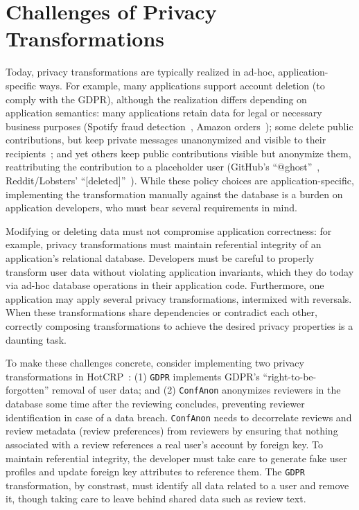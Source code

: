 \section{Challenges of Privacy Transformations}
\label{sec:survey}
%

%
Today, privacy transformations are typically realized in ad-hoc, application-specific ways.
%
For example, many applications support account deletion (\eg to comply with the GDPR),
although the realization differs depending on application semantics: many applications retain
data for legal or necessary business purposes (\eg Spotify fraud detection~\cite{spotify:privacy},
Amazon orders~\cite{amazon:privacy}); some delete public contributions, but keep private
messages unanonymized and visible to their recipients~\cite{facebook:privacy, twitter:privacy};
and yet others keep public contributions visible but anonymize them, reattributing the contribution
to a placeholder user (\eg GitHub's ``@ghost''~\cite{github:privacy}, Reddit/Lobsters'
``[deleted]''~\cite{reddit:privacy, lobsters:privacy}).
%
While these policy choices are application-specific, implementing the transformation manually
against the database is a burden on application developers, who must bear several requirements
in mind.
%

%
Modifying or deleting data must not compromise application correctness: for example, privacy
transformations must maintain referential integrity of an application's relational database.
%
Developers must be careful to properly transform user data without violating application invariants,
which they do today via ad-hoc database operations in their application code.
%
Furthermore, one application may apply several privacy transformations, intermixed with reversals.
%
When these transformations share dependencies or contradict each other, correctly composing
transformations to achieve the desired privacy properties is a daunting task.
%
%

%
To make these challenges concrete, consider implementing two privacy
transformations in HotCRP~\cite{hotcrp}:
%
(1) \texttt{GDPR} implements GDPR's ``right-to-be-forgotten'' removal of user
data; and
%
(2) \texttt{ConfAnon} anonymizes reviewers in the database some time after the
reviewing concludes, preventing reviewer identification in case of a data breach.
%
\texttt{ConfAnon} needs to decorrelate reviews and review metadata (\eg review preferences)
from reviewers by ensuring that nothing associated with a review references a real user's
account by foreign key.
%
To maintain referential integrity, the developer must take care to generate fake user profiles
and update foreign key attributes to reference them.
%
The \texttt{GDPR} transformation, by constrast, must identify all data related to a user and
remove it, though taking care to leave behind shared data such as review text.
%


